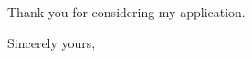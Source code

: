 \documentclass{letter}
\begin{document}
\begin{letter}{%
}

 
\noindent Thank you for considering my application.

 
\closing{Sincerely yours,}
 
  

\end{letter}
 
\end{document}
